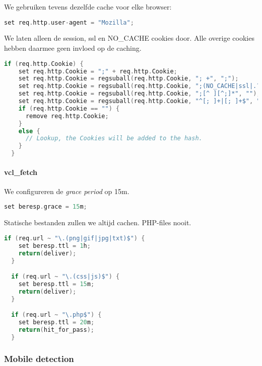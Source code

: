 We gebruiken tevens dezelfde cache voor elke browser:

\begin{lstlisting}[language=C]
  set req.http.user-agent = "Mozilla";
\end{lstlisting}

We laten alleen de session, ssl en NO\_CACHE cookies door. Alle overige cookies hebben daarmee geen invloed op de caching.

\begin{lstlisting}[language=C]
  if (req.http.Cookie) {
    set req.http.Cookie = ";" + req.http.Cookie;
    set req.http.Cookie = regsuball(req.http.Cookie, "; +", ";");
    set req.http.Cookie = regsuball(req.http.Cookie, ";(NO_CACHE|ssl|.?SESS[^=]+)=", "; \1=");
    set req.http.Cookie = regsuball(req.http.Cookie, ";[^ ][^;]*", "");
    set req.http.Cookie = regsuball(req.http.Cookie, "^[; ]+|[; ]+$", "");
    if (req.http.Cookie == "") {
      remove req.http.Cookie;
    }
    else {
      // Lookup, the Cookies will be added to the hash.
    }
  }
\end{lstlisting}

\paragraph{vcl\_fetch}

We configureren de \textit{grace period} op 15m.

\begin{lstlisting}[language=C]
  set beresp.grace = 15m;
\end{lstlisting}

Statische bestanden zullen we altijd cachen. PHP-files nooit.

\begin{lstlisting}[language=C]
  if (req.url ~ "\.(png|gif|jpg|txt)$") {
    set beresp.ttl = 1h;
    return(deliver);
  }

  if (req.url ~ "\.(css|js)$") {
    set beresp.ttl = 15m;
    return(deliver);
  }

  if (req.url ~ "\.php$") {
    set beresp.ttl = 20m;
    return(hit_for_pass);
  }
\end{lstlisting}
  
\subsubsection{Mobile detection}\label{varnishmobile}

